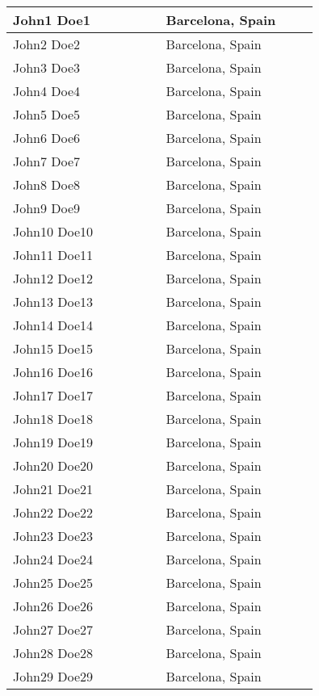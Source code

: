 
\begin{center}
\begin{longtable}{p{0.4\linewidth} p{0.4\linewidth} }
\hline
		John1 Doe1 & Barcelona, Spain \\ \hline
		John2 Doe2 & Barcelona, Spain \\ \hline
		John3 Doe3 & Barcelona, Spain \\ \hline
		John4 Doe4 & Barcelona, Spain \\ \hline
		John5 Doe5 & Barcelona, Spain \\ \hline
		John6 Doe6 & Barcelona, Spain \\ \hline
		John7 Doe7 & Barcelona, Spain \\ \hline
		John8 Doe8 & Barcelona, Spain \\ \hline
		John9 Doe9 & Barcelona, Spain \\ \hline
		John10 Doe10 & Barcelona, Spain \\ \hline
		John11 Doe11 & Barcelona, Spain \\ \hline
		John12 Doe12 & Barcelona, Spain \\ \hline
		John13 Doe13 & Barcelona, Spain \\ \hline
		John14 Doe14 & Barcelona, Spain \\ \hline
		John15 Doe15 & Barcelona, Spain \\ \hline
		John16 Doe16 & Barcelona, Spain \\ \hline
		John17 Doe17 & Barcelona, Spain \\ \hline
		John18 Doe18 & Barcelona, Spain \\ \hline
		John19 Doe19 & Barcelona, Spain \\ \hline
		John20 Doe20 & Barcelona, Spain \\ \hline
		John21 Doe21 & Barcelona, Spain \\ \hline
		John22 Doe22 & Barcelona, Spain \\ \hline
		John23 Doe23 & Barcelona, Spain \\ \hline
		John24 Doe24 & Barcelona, Spain \\ \hline
		John25 Doe25 & Barcelona, Spain \\ \hline
		John26 Doe26 & Barcelona, Spain \\ \hline
		John27 Doe27 & Barcelona, Spain \\ \hline
		John28 Doe28 & Barcelona, Spain \\ \hline
		John29 Doe29 & Barcelona, Spain \\ \hline
\end{longtable}
\end{center}